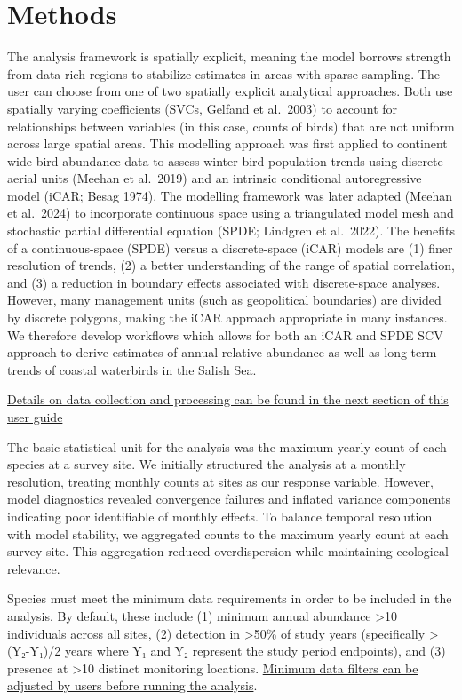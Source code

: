 \documentclass[
  letterpaper,
  DIV=11,
  numbers=noendperiod]{scrreprt}
\begin{document}
\section{Methods}\label{1.2Intro}

The analysis framework is spatially explicit, meaning the model borrows
strength from data-rich regions to stabilize estimates in areas with
sparse sampling. The user can choose from one of two spatially explicit
analytical approaches. Both use spatially varying coefficients (SVCs,
Gelfand et al.~2003) to account for relationships between variables (in
this case, counts of birds) that are not uniform across large spatial
areas. This modelling approach was first applied to continent wide bird
abundance data to assess winter bird population trends using discrete
aerial units (Meehan et al.~2019) and an intrinsic conditional
autoregressive model (iCAR; Besag 1974). The modelling framework was
later adapted (Meehan et al.~2024) to incorporate continuous space using
a triangulated model mesh and stochastic partial differential equation
(SPDE; Lindgren et al.~2022). The benefits of a continuous-space (SPDE)
versus a discrete-space (iCAR) models are (1) finer resolution of
trends, (2) a better understanding of the range of spatial correlation,
and (3) a reduction in boundary effects associated with discrete-space
analyses. However, many management units (such as geopolitical
boundaries) are divided by discrete polygons, making the iCAR approach
appropriate in many instances. We therefore develop workflows which
allows for both an iCAR and SPDE SCV approach to derive estimates of
annual relative abundance as well as long-term trends of coastal
waterbirds in the Salish Sea.

\hyperref[2.1Data]{Details on data collection and processing can be
found in the next section of this user guide}

The basic statistical unit for the analysis was the maximum yearly count
of each species at a survey site. We initially structured the analysis
at a monthly resolution, treating monthly counts at sites as our
response variable. However, model diagnostics revealed convergence
failures and inflated variance components indicating poor identifiable
of monthly effects. To balance temporal resolution with model stability,
we aggregated counts to the maximum yearly count at each survey site.
This aggregation reduced overdispersion while maintaining ecological
relevance.

Species must meet the minimum data requirements in order to be included
in the analysis. By default, these include (1) minimum annual abundance
\textgreater10 individuals across all sites, (2) detection in
\textgreater50\% of study years (specifically \textgreater(Y₂-Y₁)/2
years where Y₁ and Y₂ represent the study period endpoints), and (3)
presence at \textgreater10 distinct monitoring locations.
\hyperref[3.1Analysis]{Minimum data filters can be adjusted by users
before running the analysis}.
\end{document}
